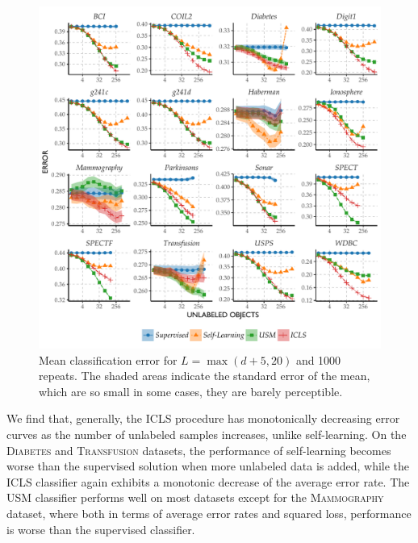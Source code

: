 \documentclass[twoside]{memoir}\usepackage[]{graphicx}\usepackage{xcolor}
\makeatletter
\def\maxwidth{ %
  \ifdim\Gin@nat@width>\linewidth
    \linewidth
  \else
    \Gin@nat@width
  \fi
}
\newenvironment{knitrout}{}{} %
\newcommand{\featdim}{d}
\newcommand{\Nlab}{L}
\makeatother
\begin{document}
\begin{knitrout}
\color{fgcolor}\begin{figure}
\includegraphics[width=\maxwidth]{figure/errorcurves-icls-1} \caption[Mean classification error for $\Nlab=\max(\featdim+5,20)$ and 1000 repeats]{Mean classification error for $\Nlab=\max(\featdim+5,20)$ and 1000 repeats. The shaded areas indicate  the standard error of the mean, which are so small in some cases, they are barely perceptible.}\label{fig:errorcurves-icls}
\end{figure}


\end{knitrout}


We find that, generally, the ICLS procedure has monotonically decreasing error curves as the number of unlabeled samples increases, unlike self-learning. On the \textsc{Diabetes} and \textsc{Transfusion} datasets, the performance of self-learning becomes worse than the supervised solution when more unlabeled data is added, while the ICLS classifier again exhibits a monotonic decrease of the average error rate. The USM classifier performs well on most datasets except for the \textsc{Mammography} dataset, where both in terms of average error rates and squared loss, performance is worse than the supervised classifier.
\end{document}

